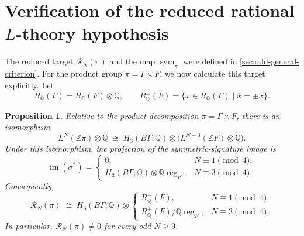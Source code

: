 \documentclass[10pt,reqno]{amsart}
\numberwithin{equation}{section}
\newtheorem{proposition}{Proposition}
\theoremstyle{definition}
\theoremstyle{remark}
\newcommand{\Z}{\mathbb Z}
\newcommand{\Q}{\mathbb Q}
\newcommand{\C}{\mathbb C}
\newcommand{\cR}{\mathcal R}
\begin{document}
\section{Verification of the reduced rational \texorpdfstring{\(L\)}{L}-theory hypothesis}
\label{sec:odd-L-verification}

The reduced target \(\cR_N(\pi)\) and the map
\(\operatorname{sym}_\pi\) were defined in
\cref{sec:odd-general-criterion}.  For the product group
\(\pi=\Gamma\times F\), we now calculate this target explicitly.
Let
\[
R_{\Q}(F)=R_{\C}(F)\otimes\Q,
\qquad
R^{\pm}_{\Q}(F)
=
\{x\in R_{\Q}(F)\mid\overline{x}=\pm x\}.
\]

\begin{proposition}\label{prop:odd-rational-summand}
Relative to the product decomposition \(\pi=\Gamma\times F\), there is
an isomorphism
\begin{equation}\label{eq:odd-L-product-identification}
L^N(\Z\pi)\otimes\Q
\;\cong\;
H_3(B\Gamma;\Q)\otimes
\bigl(L^{N-3}(\Z F)\otimes\Q\bigr).
\end{equation}
Under this isomorphism, the projection of the symmetric-signature image
is
\begin{equation}\label{eq:odd-signature-image}
\operatorname{im}(\sigma^*)
=
\begin{cases}
0,
 & N\equiv1\pmod4,\\[2mm]
H_3(B\Gamma;\Q)\otimes
\Q\operatorname{reg}_F,
 & N\equiv3\pmod4.
\end{cases}
\end{equation}
Consequently,
\begin{equation}\label{eq:odd-reduced-target-explicit}
\cR_N(\pi)
\;\cong\;
H_3(B\Gamma;\Q)\otimes
\begin{cases}
R^-_{\Q}(F),&N\equiv1\pmod4,\\[2mm]
R^+_{\Q}(F)/\Q\operatorname{reg}_F,
&N\equiv3\pmod4.
\end{cases}
\end{equation}
In particular, \(\cR_N(\pi)\neq0\) for every odd \(N\geq9\).
\end{proposition}
\end{document}
